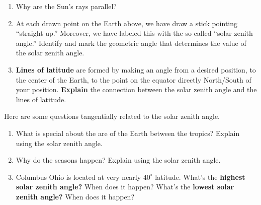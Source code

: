 \documentclass[noauthor,nooutcomes,handout,hints]{ximera}
\begin{document}
\begin{question}
\begin{center}
  \end{center}
  \begin{enumerate}
  \item Why are the Sun's rays parallel?
  \item At each drawn point on the Earth above, we have draw a stick
    pointing ``straight up.'' Moreover, we have labeled this with the
    so-called ``solar zenith angle.'' Identify and mark the geometric angle
    that determines the value of the solar zenith angle.
  \item \textbf{Lines of latitude} are formed by making an angle from
    a desired position, to the center of the Earth, to the point on
    the equator directly North/South of your position. \textbf{Explain}
    the connection between the solar zenith angle and the lines of latitude.
  \end{enumerate}
 
\end{question}
\mynewpage




\begin{question}
  Here are some questions tangentially related to the solar zenith angle.
  \begin{enumerate}
  \item What is special about the are of the Earth between the tropics? Explain using the solar zenith angle.
  \item Why do the seasons happen? Explain using the solar zenith angle.
  \item Columbus Ohio is located at very nearly $40^\circ$
    latitude. What's the \textbf{highest solar zenith angle?} When does it
    happen? What's the \textbf{lowest solar zenith angle?} When does it happen?
  \end{enumerate}
\end{question}
\end{document}
